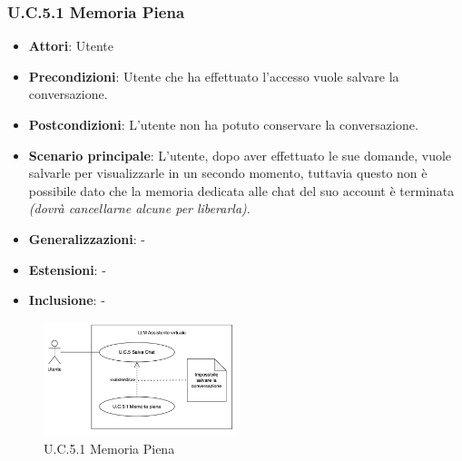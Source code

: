 \subsubsection{U.C.5.1 Memoria Piena}
\begin{itemize}
    \item \textbf{Attori}: Utente
    \item \textbf{Precondizioni}: Utente che ha effettuato l'accesso vuole salvare la conversazione.
    \item \textbf{Postcondizioni}: L'utente non ha potuto conservare la conversazione.
    \item \textbf{Scenario principale}: L’utente, dopo aver effettuato le sue domande, vuole salvarle per visualizzarle in un secondo momento, tuttavia questo non è possibile dato che la memoria dedicata alle chat del suo account è terminata \textit{(dovrà cancellarne alcune per liberarla)}.
    \item \textbf{Generalizzazioni}: -
    \item \textbf{Estensioni}: -
    \item \textbf{Inclusione}: -
\end{itemize}
\begin{figure}[h!]
    \centering
    \includegraphics[width=0.5\textwidth]{img/UC5-1.png}
    \caption{U.C.5.1 Memoria Piena}
\end{figure}
